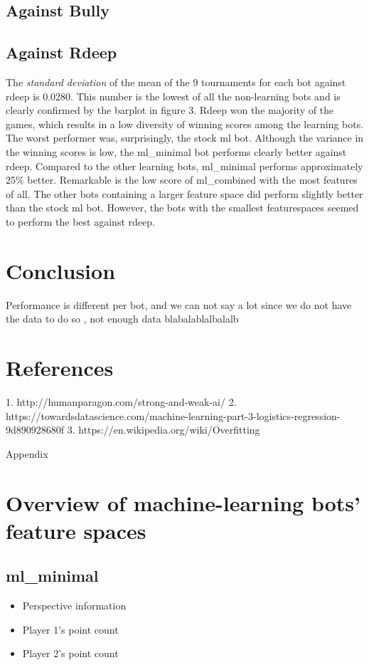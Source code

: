 \documentclass[a4paper,11pt]{article}
\begin{document}
\subsection*{Against Bully}


\subsection*{Against Rdeep}
The \textit{standard deviation} of the mean of the 9 tournaments for each bot against rdeep is 0.0280. This number is the lowest of all the non-learning bots and is clearly confirmed by the barplot in figure 3. Rdeep won the majority of the games, which results in a low diversity of winning scores among the learning bots. The worst performer was, surprisingly, the stock ml bot. Although the variance in the winning scores is low, the ml\_minimal bot performs clearly better against rdeep. Compared to the other learning bots, ml\_minimal performs approximately 25\% better. Remarkable is the low score of ml\_combined with the most features of all. The other bots containing a larger feature space did perform slightly better than the stock ml bot.  However, the bots with the smallest featurespaces seemed to perform the best against rdeep.







\section{Conclusion}
Performance is different per bot, and we can not say a lot since we do not have the data to do so , not enough data blabalablalbalalb





\section{References}
1. http://humanparagon.com/strong-and-weak-ai/
2. https://towardsdatascience.com/machine-learning-part-3-logistics-regression-9d890928680f
3. https://en.wikipedia.org/wiki/Overfitting

Appendix
\section{Overview of machine-learning bots' feature spaces}
\subsection{ml\_minimal}
\begin{itemize}
\item Perspective information
\item Player 1's point count
\item Player 2's point count
\end{itemize}
\end{document}
